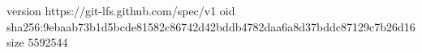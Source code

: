 version https://git-lfs.github.com/spec/v1
oid sha256:9ebaab73b1d5bcde81582c86742d42bddb4782daa6a8d37bddc87129c7b26d16
size 5592544
